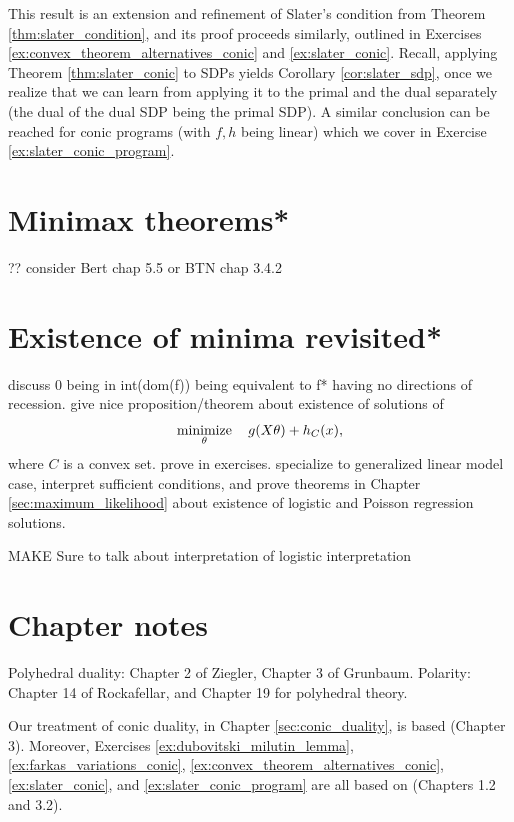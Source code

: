 This result is an extension and refinement of Slater's condition from Theorem 
\ref{thm:slater_condition}, and its proof proceeds similarly, outlined in
Exercises \ref{ex:convex_theorem_alternatives_conic} and \ref{ex:slater_conic}.  
Recall, applying Theorem \ref{thm:slater_conic} to SDPs yields Corollary 
\ref{cor:slater_sdp}, once we realize that we can learn from applying it to the
primal and the dual separately (the dual of the dual SDP being the primal SDP). 
A similar conclusion can be reached for conic programs (with $f,h$ being linear)
which we cover in Exercise \ref{ex:slater_conic_program}.

\section{Minimax theorems*}
\label{sec:minimax_theorems}

?? consider Bert chap 5.5 or BTN chap 3.4.2 

\section{Existence of minima revisited*}
\label{sec:existence_minima_revisited}

discuss 0 being in int(dom(f)) being equivalent to f* having no directions
of recession.  give nice proposition/theorem about existence of solutions of 
$$
\operatorname*{minimize}_\theta \quad g(X \theta) + h_C(x),
$$
where $C$ is a convex set. prove in exercises. specialize to generalized linear
model case, interpret sufficient conditions, and prove theorems in Chapter
\ref{sec:maximum_likelihood} about existence of logistic and Poisson regression
solutions. 


MAKE Sure to talk about interpretation of logistic interpretation

\SkipTocEntry\section*{Chapter notes}

Polyhedral duality: Chapter 2 of Ziegler, Chapter 3 of Grunbaum.
Polarity: Chapter 14 of Rockafellar, and Chapter 19 for polyhedral theory.

Our treatment of conic duality, in Chapter \ref{sec:conic_duality}, is based 
\cite{bental2023convex} (Chapter 3). Moreover, Exercises
\ref{ex:dubovitski_milutin_lemma}, \ref{ex:farkas_variations_conic}, 
\ref{ex:convex_theorem_alternatives_conic}, \ref{ex:slater_conic}, and 
\ref{ex:slater_conic_program} are all based on \cite{bental2023convex} (Chapters
1.2 and 3.2).  

